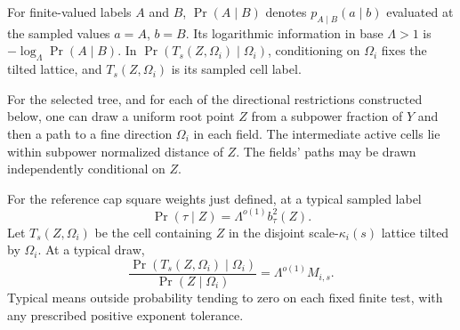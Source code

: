 For finite-valued labels $A$ and $B$, $\Pr(A\mid B)$ denotes
$p_{A\mid B}(a\mid b)$ evaluated at the sampled values $a=A$, $b=B$.
Its logarithmic information in base $\Lambda>1$ is
$-\log_\Lambda\Pr(A\mid B)$. In
$\Pr(T_s(Z,\Omega_i)\mid\Omega_i)$, conditioning on $\Omega_i$ fixes
the tilted lattice, and $T_s(Z,\Omega_i)$ is its sampled cell label.

\begin{lemma}\label{f:paths}
For the selected tree, and for each of the directional restrictions
constructed below, one can draw a uniform root point $Z$ from a
subpower fraction of $Y$ and then a path to a fine direction $\Omega_i$
in each field. The intermediate active cells lie within subpower
normalized distance of $Z$. The fields' paths may be drawn
independently conditional on $Z$.

For the reference cap square weights just defined, at a typical
sampled label
\begin{equation}\label{f:cap-law}
 \Pr(\tau\mid Z)=\Lambda^{o(1)}b_\tau^2(Z).
\end{equation}
Let $T_s(Z,\Omega_i)$ be the cell containing $Z$ in the disjoint
scale-$\kappa_i(s)$ lattice tilted by $\Omega_i$. At a typical draw,
\begin{equation}\label{f:occupancy-law}
 \frac{\Pr(T_s(Z,\Omega_i)\mid\Omega_i)}
      {\Pr(Z\mid\Omega_i)}=\Lambda^{o(1)}M_{i,s}.
\end{equation}
Typical means outside probability tending to zero on each fixed
finite test, with any prescribed positive exponent tolerance.
\end{lemma}

